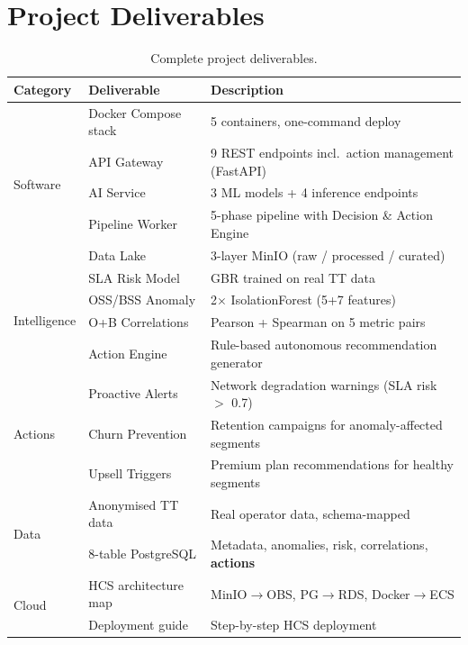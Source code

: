 \documentclass[12pt,a4paper]{report}
\begin{document}
\chapter{Project Deliverables}

\begin{table}[H]
\centering\small
\caption{Complete project deliverables.}
\begin{tabularx}{\textwidth}{@{}llX@{}}
\toprule
\textbf{Category} & \textbf{Deliverable} & \textbf{Description} \\
\midrule
\multirow{5}{*}{Software}
  & Docker Compose stack & 5 containers, one-command deploy \\
  & API Gateway          & 9 REST endpoints incl.\ action management (FastAPI) \\
  & AI Service           & 3 ML models + 4 inference endpoints \\
  & Pipeline Worker      & 5-phase pipeline with Decision \& Action Engine \\
  & Data Lake            & 3-layer MinIO (raw / processed / curated) \\
\midrule
\multirow{4}{*}{Intelligence}
  & SLA Risk Model       & GBR trained on real TT data \\
  & OSS/BSS Anomaly      & 2$\times$ IsolationForest (5+7 features) \\
  & O+B Correlations     & Pearson + Spearman on 5 metric pairs \\
  & Action Engine        & Rule-based autonomous recommendation generator \\
\midrule
\multirow{3}{*}{Actions}
  & Proactive Alerts     & Network degradation warnings (SLA risk $>$ 0.7) \\
  & Churn Prevention     & Retention campaigns for anomaly-affected segments \\
  & Upsell Triggers      & Premium plan recommendations for healthy segments \\
\midrule
\multirow{2}{*}{Data}
  & Anonymised TT data   & Real operator data, schema-mapped \\
  & 8-table PostgreSQL   & Metadata, anomalies, risk, correlations, \textbf{actions} \\
\midrule
\multirow{2}{*}{Cloud}
  & HCS architecture map & MinIO$\to$OBS, PG$\to$RDS, Docker$\to$ECS \\
  & Deployment guide     & Step-by-step HCS deployment \\
\bottomrule
\end{tabularx}
\end{table}
\end{document}
